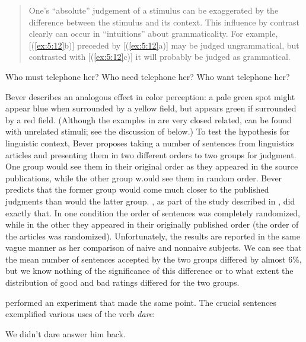 \begin{quote}
One's ``absolute'' judgement of a stimulus can be exaggerated by the difference between the stimulus and its context. This influence by contrast clearly can occur in ``intuitions'' about grammaticality. For example, [(\ref{ex:5:12}b)] preceded by [(\ref{ex:5:12}a)] may be judged ungrammatical, but contrasted with [(\ref{ex:5:12}c)] it will probably be judged as grammatical. \citep[346\textendash{}47]{Bever1970a}
\end{quote}

\ea \label{ex:5:12}
\ea
Who must telephone her? 
\ex Who need telephone her? 
\ex Who want telephone her?
\z
\z

\noindent
Bever describes an analogous effect in color perception: a pale green spot might appear blue when surrounded by a yellow field, but appears green if surrounded by a red field. (Although the examples in  are very closed related,  can be found with unrelated stimuli; see the discussion of \citet{Snow1975} below.) To test the hypothesis for linguistic context, Bever proposes taking a number of sentences  from linguistics articles and presenting them in two different orders to two groups for judgment. One group would see them in their original order as they appeared in the source publications, while the other group w.ould see them in random order. Bever predicts that the former group would come much closer to the published judgments than would the latter group. \citet{Spencer1973}, as part of the study described in , did exactly that. In one condition the order of sentences was completely randomized, while in the other they appeared in their originally published order (the order of the articles was randomized). Unfortunately, the results are reported in the same vague manner as her comparison of naive and nonnaive subjects. We can see that the mean number of sentences accepted by the two groups differed by almost 6\%, but we know nothing of the significance of this difference or to what extent the distribution of good and bad ratings differed for the two groups.

\citet{Greenbaum1976a} performed an experiment that made the same point.
The crucial sentences exemplified various uses of the verb \textit{dare}:

\ea\label{ex:5:13} 
We didn't dare answer him back.
\z

